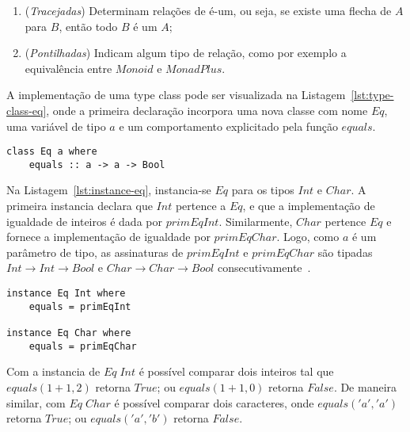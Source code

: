 \documentclass[10pt, conference]{IEEEtran}
\begin{document}
\begin{enumerate}[label=(\alph*), leftmargin=3em, topsep = 0pt, itemsep = 1ex, partopsep = 1ex, parsep = 1ex]
	\item (\textit{Tracejadas}) Determinam relações de é-um, ou seja, se existe uma flecha de $A$ para $B$, então todo $B$ é um $A$;
	\item (\textit{Pontilhadas}) Indicam algum tipo de relação, como por exemplo a equivalência entre $Monoid$ e $MonadPlus$.
\end{enumerate}

A implementação de uma type class pode ser visualizada na Listagem~\ref{lst:type-class-eq}, onde a primeira declaração incorpora uma nova classe com nome $Eq$, uma variável de tipo $a$ e um comportamento explicitado pela função $equals$. 

\begin{lstlisting}[caption={Type class Eq\protect\footref{fnt:type-class-eq}}, label={lst:type-class-eq}]
class Eq a where
	equals :: a -> a -> Bool
\end{lstlisting}

Na Listagem~\ref{lst:instance-eq}, instancia-se $Eq$ para os tipos $Int$ e $Char$. A primeira instancia declara que $Int$ pertence a $Eq$, e que a implementação de igualdade de inteiros é dada por $primEqInt$. Similarmente, $Char$ pertence $Eq$ e fornece a implementação de igualdade por $primEqChar$. Logo, como $a$ é um parâmetro de tipo, as assinaturas de $primEqInt$ e $primEqChar$ são tipadas ${Int \rightarrow Int \rightarrow Bool}$ e ${Char \rightarrow Char \rightarrow Bool}$ consecutivamente~\cite{hall1996type}.

\begin{lstlisting}[caption={Instancias Eq\protect\footref{fnt:type-class-eq}}, label={lst:instance-eq}]
instance Eq Int where
	equals = primEqInt
	
instance Eq Char where
	equals = primEqChar
\end{lstlisting}
	
\addtocounter{footnote}{1}

Com a instancia de $Eq \; Int$ é possível comparar dois inteiros tal que ${equals({1 + 1}, 2)}$ retorna $True$; ou ${equals({1 + 1}, 0)}$ retorna $False$. De maneira similar, com $Eq \; Char$ é possível comparar dois caracteres, onde ${equals('a', {'a'})}$ retorna $True$; ou ${equals('a', {'b'})}$ retorna $False$.
\end{document}

